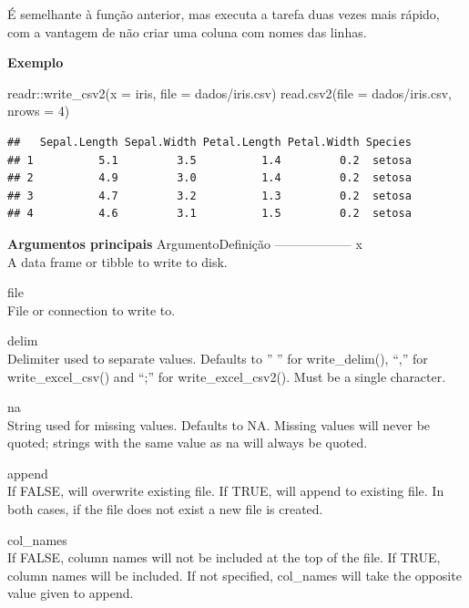 \documentclass[
]{book}
\newenvironment{Shaded}{\begin{snugshade}}{\end{snugshade}}
\newcommand{\AttributeTok}[1]{\textcolor[rgb]{0.77,0.63,0.00}{#1}}
\newcommand{\DecValTok}[1]{\textcolor[rgb]{0.00,0.00,0.81}{#1}}
\newcommand{\FunctionTok}[1]{\textcolor[rgb]{0.00,0.00,0.00}{#1}}
\newcommand{\NormalTok}[1]{#1}
\newcommand{\SpecialCharTok}[1]{\textcolor[rgb]{0.00,0.00,0.00}{#1}}
\newcommand{\StringTok}[1]{\textcolor[rgb]{0.31,0.60,0.02}{#1}}
\theoremstyle{definition}
\theoremstyle{definition}
\theoremstyle{definition}
\theoremstyle{definition}
\theoremstyle{remark}
\begin{document}
É semelhante à função anterior, mas executa a tarefa duas vezes mais rápido, com a vantagem de não criar uma coluna com nomes das linhas.

\textbf{Exemplo}

\begin{Shaded}
\begin{Highlighting}[]
\NormalTok{readr}\SpecialCharTok{::}\FunctionTok{write\_csv2}\NormalTok{(}\AttributeTok{x =}\NormalTok{ iris, }\AttributeTok{file =} \StringTok{\textquotesingle{}dados/iris.csv\textquotesingle{}}\NormalTok{)}
\FunctionTok{read.csv2}\NormalTok{(}\AttributeTok{file =} \StringTok{\textquotesingle{}dados/iris.csv\textquotesingle{}}\NormalTok{, }\AttributeTok{nrows =} \DecValTok{4}\NormalTok{)}
\end{Highlighting}
\end{Shaded}

\begin{verbatim}
##   Sepal.Length Sepal.Width Petal.Length Petal.Width Species
## 1          5.1         3.5          1.4         0.2  setosa
## 2          4.9         3.0          1.4         0.2  setosa
## 3          4.7         3.2          1.3         0.2  setosa
## 4          4.6         3.1          1.5         0.2  setosa
\end{verbatim}

\textbf{Argumentos principais}
Argumento\textbar Definição
---------\textbar---------
x\\
A data frame or tibble to write to disk.

file\\
File or connection to write to.

delim\\
Delimiter used to separate values. Defaults to '' '' for write\_delim(), ``,'' for write\_excel\_csv() and ``;'' for write\_excel\_csv2(). Must be a single character.

na\\
String used for missing values. Defaults to NA. Missing values will never be quoted; strings with the same value as na will always be quoted.

append\\
If FALSE, will overwrite existing file. If TRUE, will append to existing file. In both cases, if the file does not exist a new file is created.

col\_names\\
If FALSE, column names will not be included at the top of the file. If TRUE, column names will be included. If not specified, col\_names will take the opposite value given to append.
\end{document}
